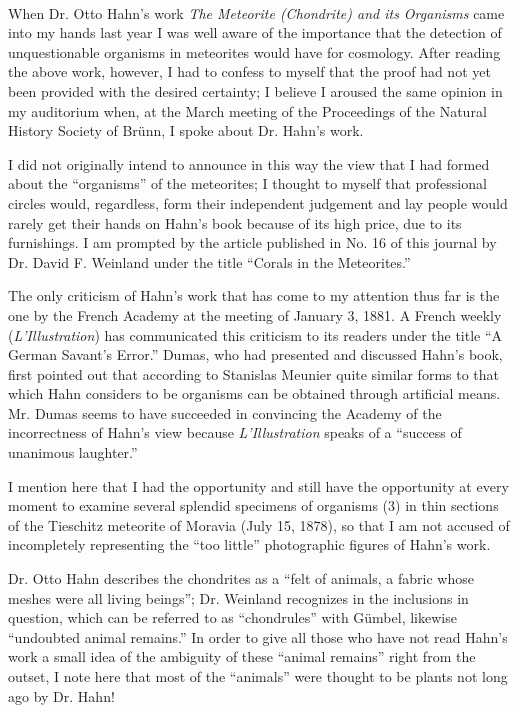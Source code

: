 \documentclass[a4paper, 12pt, oneside]{article}
\begin{document}
\paragraph*{}
When Dr. Otto Hahn's work \emph{The Meteorite (Chondrite) and its Organisms} came into my hands last year I was well aware of the importance that the detection of unquestionable organisms in meteorites would have for cosmology. After reading the above work, however, I had to confess to myself that the proof had not yet been provided with the desired certainty; I believe I aroused the same opinion in my auditorium when, at the March meeting of the Proceedings of the Natural History Society of Brünn, I spoke about Dr. Hahn's work.

I did not originally intend to announce in this way the view that I had formed about the ``organisms'' of the meteorites; I thought to myself that professional circles would, regardless, form their independent judgement and lay people would rarely get their hands on Hahn's book because of its high price, due to its furnishings. I am prompted by the article published in No. 16 of this journal by Dr. David F. Weinland under the title ``Corals in the Meteorites.''

The only criticism of Hahn's work that has come to my attention thus far is the one by the French Academy at the meeting of January 3, 1881. A French weekly (\emph{L'Illustration}) has communicated this criticism to its readers under the title ``A German Savant's Error.'' Dumas, who had presented and discussed Hahn's book, first pointed out that according to Stanislas Meunier quite similar forms to that which Hahn considers to be organisms can be obtained through artificial means. Mr. Dumas seems to have succeeded in convincing the Academy of the incorrectness of Hahn's view because \emph{L'Illustration} speaks of a ``success of unanimous laughter.''

I mention here that I had the opportunity and still have the opportunity at every moment to examine several splendid specimens of organisms (3) in thin sections of the Tieschitz meteorite of Moravia (July 15, 1878), so that I am not accused of incompletely representing the ``too little'' photographic figures of Hahn's work.

Dr. Otto Hahn describes the chondrites as a ``felt of animals, a fabric whose meshes were all living beings''; Dr. Weinland recognizes in the inclusions in question, which can be referred to as ``chondrules'' with Gümbel, likewise ``undoubted animal remains.'' In order to give all those who have not read Hahn's work a small idea of the ambiguity of these ``animal remains'' right from the outset, I note here that most of the ``animals'' were thought to be plants not long ago by Dr. Hahn!
\clearpage
\end{document}
